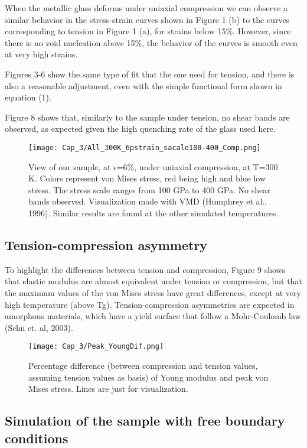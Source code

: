 When the metallic glass deforms under uniaxial compression we can observe a similar behavior in the stress-strain curves shown in Figure 1 (b) to the curves corresponding to tension in Figure 1 (a), for strains below 15\%. However, since there is no void nucleation above 15\%, the behavior of the curves is smooth even at very high strains.

Figures 3-6 show the same type of fit that the one used for tension, and there is also a reasonable adjustment, even with the simple functional form shown in equation (1).

Figure 8 shows that, similarly to the sample under tension, no shear bands are observed, as expected given the high quenching rate of the glass used here.

\begin{figure}[htp]
\centering
\texttt{[image: Cap\_3/All\_300K\_6pstrain\_sacale100-400\_Comp.png]}
\caption{View of our sample, at $\epsilon$=6\%, under uniaxial compression, at T=300 K. Colors represent von Mises stress, red being high and blue low stress. The stress scale ranges from 100 GPa to 400 GPa. No shear bands observed. Visualization made with VMD (Humphrey et al., 1996). Similar results are found at the other simulated temperatures.}
\label{C3:fg:sampleComp}
\end{figure}

\subsection{Tension-compression asymmetry}

To highlight the differences between tension and compression, Figure 9 shows that elastic modulus are almost equivalent under tension or compression, but that the maximum values of the von Mises stress have great differences, except at very high temperature (above Tg). Tension-compression asymmetries are expected in amorphous materials, which have a yield surface that follow a Mohr-Coulomb law (Schu et. al, 2003).

\begin{figure}[htp]
\centering
\texttt{[image: Cap\_3/Peak\_YoungDif.png]}
\caption{Percentage difference (between compression and tension values, assuming tension values as basis) of Young modulus and peak von Mises stress. Lines are just for visualization.}
\label{C3:fg:peakYoungDif}
\end{figure}

\subsection{Simulation of the sample with free boundary conditions}

